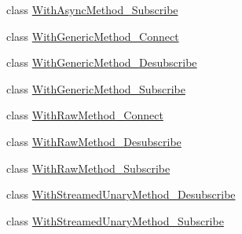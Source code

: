 \begin{DoxyCompactItemize}
class \hyperlink{classtbMessages_1_1TarboraMessages_1_1WithAsyncMethod__Subscribe}{With\+Async\+Method\+\_\+\+Subscribe}
\item 
class \hyperlink{classtbMessages_1_1TarboraMessages_1_1WithGenericMethod__Connect}{With\+Generic\+Method\+\_\+\+Connect}
\item 
class \hyperlink{classtbMessages_1_1TarboraMessages_1_1WithGenericMethod__Desubscribe}{With\+Generic\+Method\+\_\+\+Desubscribe}
\item 
class \hyperlink{classtbMessages_1_1TarboraMessages_1_1WithGenericMethod__Subscribe}{With\+Generic\+Method\+\_\+\+Subscribe}
\item 
class \hyperlink{classtbMessages_1_1TarboraMessages_1_1WithRawMethod__Connect}{With\+Raw\+Method\+\_\+\+Connect}
\item 
class \hyperlink{classtbMessages_1_1TarboraMessages_1_1WithRawMethod__Desubscribe}{With\+Raw\+Method\+\_\+\+Desubscribe}
\item 
class \hyperlink{classtbMessages_1_1TarboraMessages_1_1WithRawMethod__Subscribe}{With\+Raw\+Method\+\_\+\+Subscribe}
\item 
class \hyperlink{classtbMessages_1_1TarboraMessages_1_1WithStreamedUnaryMethod__Desubscribe}{With\+Streamed\+Unary\+Method\+\_\+\+Desubscribe}
\item 
class \hyperlink{classtbMessages_1_1TarboraMessages_1_1WithStreamedUnaryMethod__Subscribe}{With\+Streamed\+Unary\+Method\+\_\+\+Subscribe}
\end{DoxyCompactItemize}
